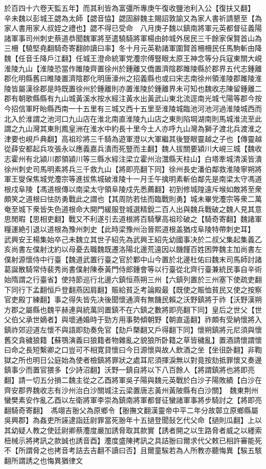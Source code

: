 於百四十六卷天監五年】而其利皆為富彊所專庚午復收鹽池利入公【復扶又翻】　辛未魏以彭城王勰為太師【勰音恊】勰固辭魏主賜詔敦諭又為家人書祈請懇至【為家人書用家人叔姪之禮也】勰不得已受命　八月庚子魏以鎮南將軍元英都督征義陽諸軍事司州刺史蔡道恭聞魏軍將至遣驍騎將軍楊由帥城外居民三千餘家保賢首山為三柵【驍堅堯翻騎奇寄翻帥讀曰率】冬十月元英勒諸軍圍賢首柵柵民任馬駒斬由降魏【任音壬降戶江翻】任城王澄命統軍党灋宗傅豎眼太原王神念等分兵寇東關大峴淮陵九山【淮陵恐當作雎陵齊置徐州於鍾離又僑置濟陰郡雎陵縣於郡界五代志鍾離郡化明縣舊曰睢陵置濟陰郡化明唐濠州之招義縣也或曰宋志南徐州領淮陵郡雎陵淮陵皆屬漢徐郡是時既置徐州於鍾離則亦置淮陵於鍾離界未可知也魏收志陳留鍾離二郡有朝歌縣縣有九山城黃溪水按水經注黃水出黃武山東北流逕南光城弋陽等郡今按今招信軍盱眙縣西南一十五里有三城又西十五里至淮陵城臨池河池河過淮陵城西而北入於淮謂之池河口九山店在淮北南直淮陵九山店之東則陷堈湖南則馬城淮流至此謂之九山灣其東則鳳皇洲在淮水中約長十里今土人亦呼九山灣為獅子渡北兵渡淮之津要也峴戶典翻】高祖珍將三千騎為遊軍澄以大軍繼其後豎眼靈越之子也【傳靈越從薛安都起兵攻張永以應義嘉兵潰而死豎而主翻】魏人拔關要潁川大峴三城【魏收志霍州有北潁川郡領潁川等三縣水經注梁立霍州治灊縣天柱山】白塔牽城清溪皆潰徐州刺史司馬明素將兵三千救九山【將即亮翻下同】徐州長史潘伯鄰救淮陵寧朔將軍王燮保焦城党灋宗等進拔焦城破淮陵十一月壬午擒明素斬伯鄰先是南梁太守馮道根戍阜陵【馮道根傳以南梁太守領阜陵戍先悉薦翻】初到修城隍遠斥堠如敵將至衆頗笑之道根曰怯防勇戰此之謂也【其周防若怯而臨戰則勇】城未畢党灋宗等衆二萬奄至城下衆皆失色道根命大開門緩服登城選精銳二百人出與魏兵戰破之魏人見其意思閒暇【思相吏翻】戰又不利遂引去道根將百騎擊高祖珍破之【騎奇寄翻】魏諸軍糧運絶引退以道根為豫州刺史【此時梁豫州治晉熙道根盖猶戍阜陵特帶刺史耳】　武興安王楊集始卒己未魏立其世子紹先為武興王紹先幼國事决於二叔父集起集義乙亥尚書左僕射沈約以母憂去職魏既遷洛陽北邊荒遠因以饑饉百姓困弊魏主加尚書左僕射源懷侍中行臺【魏道武置行臺之官於鄴中山今置於北邊杜佑曰魏末司馬師討諸葛誕散騎常侍裴秀尚書僕射陳泰黃門侍郎鍾會等以行臺從北齊行臺兼統民事自辛術始隋謂之行臺省】使持節巡行北邊六鎮恒燕朔三州【六鎮列置於三州塞下使疏吏翻下同行下孟翻恒戶登翻燕因肩翻】賑給貧乏考論殿最【既使之賑恤貧民又使之按察官吏殿丁練翻】事之得失皆先决後聞懷通濟有無饑民賴之沃野鎮將于祚【沃野漢朔方郡之屬縣也魏平赫連與統萬同置鎮不在六鎮之數將即亮翻下同】皇后之世父【世父伯父承世嫡者】與壞通婚時于勁方用事勢傾朝野【朝直遥翻】祚頗有受納懷將入鎮祚郊迎道左懷不與語即劾奏免官【劾戶槩翻又戶得翻下同】懷朔鎮將元尼須與懷舊交貪穢狼籍【蘇鶚演義曰狼籍者物雜亂之貌狼所卧籍之草皆穢亂】置酒請懷謂懷曰命之長短繫卿之口豈可不相寛貸懷曰今日源懷與故人飲酒之坐【坐徂卧翻】非鞫獄之所也明日公庭始為使者檢鎮將罪狀之處耳尼須揮淚無以對竟按劾抵罪懷又奏邊鎮事少而置官猥多【少詩沼翻】沃野一鎮自將以下八百餘人【將謂鎮將也將即亮翻】請一切五分損二魏主從之乙酉將軍吳子陽與魏元英戰於白沙子陽敗績【白沙在齊安郡界魏收志有沙州治白沙關城注云梁置唐志黃州黃陂縣有白沙關】　魏東荆州蠻樊素安作亂乙酉以左衛將軍李崇為鎮南將軍都督征蠻諸軍事將步騎討之【將即亮翻騎奇寄翻】　馮翊吉翂父為原鄉令【翂撫文翻漢靈帝中平二年分故鄣立原鄉縣屬吳興郡】為姦吏所誣逮詣廷尉罪當死翂年十五撾登聞鼔乞代父命【撾則瓜翻】上以其幼疑人教之使廷尉卿蔡灋度嚴加誘脅取其款實【誘者開之以生路脅者威之以纆索杻械示將拷訊之款誠也誘音酉】灋度盛陳拷訊之具詰翂曰爾求代父敕已相許審能死不【所謂脅之也拷音考詰去吉翻不讀曰否】且爾童騃若為人所教亦聽悔異【騃五駭翻所謂誘之也悔異猶律文